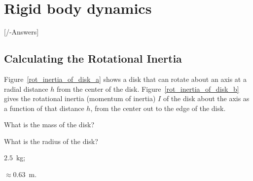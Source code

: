 
\chapter{Rigid body dynamics}\label{\currfilebase}
[\currfilebase/\currfilebase-Answers]
%

\section{Calculating the Rotational Inertia}

\begin{problem}\label{prb:rot_inertia_of_disk}
	Figure~\ref{rot_inertia_of_disk_a} shows a disk that can rotate about an axis at a radial distance $h$ from the center of the disk. Figure~\ref{rot_inertia_of_disk_b} gives the rotational inertia (momentum of inertia) $I$ of the disk about the axis as a function of that distance $h$, from the center out to the edge of the disk. 
	\begin{enumerate*}[label=(\alph*)]
		\item 	What is the mass of the disk?
		\item 	What is the radius of the disk?
	\end{enumerate*}
	\begin{solution}
		\begin{enumerate*}[label=(\alph*)]
			\item $2.5$~\si{\kilo\gram};
			\item $\approx 0.63$~\si{\meter}.
		\end{enumerate*}
	\end{solution}
\end{problem}


